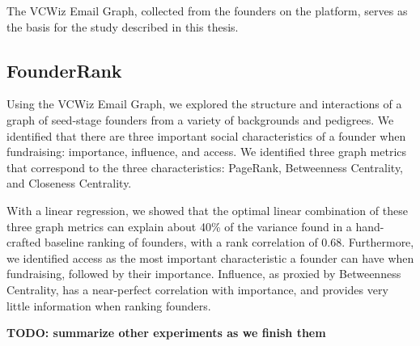 The VCWiz Email Graph, collected from the founders on the platform, serves as the basis for the study described in this thesis.

\subsection{FounderRank}

Using the VCWiz Email Graph, we explored the structure and interactions of a graph of seed-stage founders from a variety of backgrounds and pedigrees. We identified that there are three important social characteristics of a founder when fundraising: importance, influence, and access. We identified three graph metrics that correspond to the three characteristics: PageRank, Betweenness Centrality, and Closeness Centrality.

With a linear regression, we showed that the optimal linear combination of these three graph metrics can explain about 40\% of the variance found in a hand-crafted baseline ranking of founders, with a rank correlation of $0.68$. Furthermore, we identified access as the most important characteristic a founder can have when fundraising, followed by their importance. Influence, as proxied by Betweenness Centrality, has a near-perfect correlation with importance, and provides very little information when ranking founders.

\textbf{TODO: summarize other experiments as we finish them}

